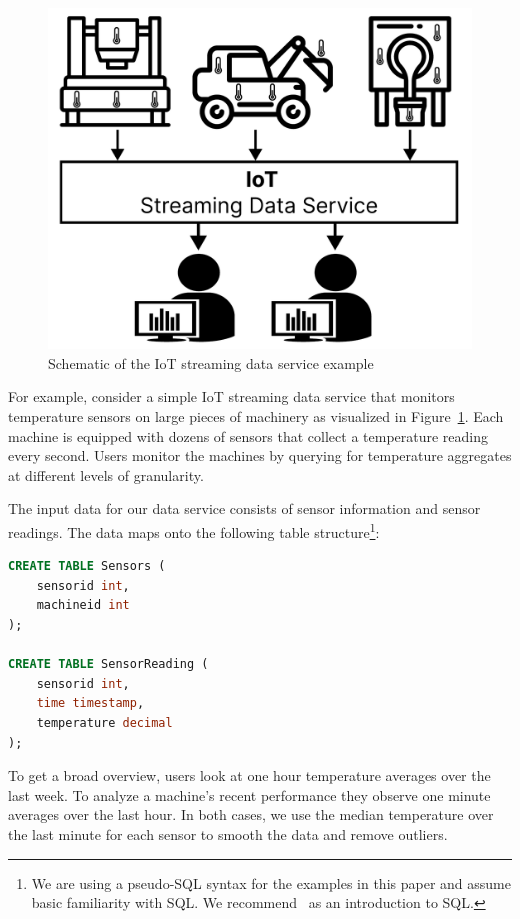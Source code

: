 \documentclass[	DIV=calc,%
							paper=letter,%
							fontsize=11pt,%
							twocolumn]{scrartcl}	 					%
\begin{document}
\begin{figure}[h]
\includegraphics[width=\linewidth]{iot_example_schematic.pdf}
\caption{Schematic of the IoT streaming data service example}
\label{fig:iot_example}
\end{figure}

For example, consider a simple IoT streaming data service that monitors temperature sensors on large pieces of machinery as visualized in Figure~\ref{fig:iot_example}. Each machine is equipped with dozens of sensors that collect a temperature reading every second. Users monitor the machines by querying for temperature aggregates at different levels of granularity.

The input data for our data service consists of sensor information and sensor readings. The data maps onto the following table structure\footnote{We are using a pseudo-SQL syntax for the examples in this paper and assume basic familiarity with SQL. We recommend~\cite{} as an introduction to SQL.}:
\begin{lstlisting}[language=SQL]
CREATE TABLE Sensors (
    sensorid int,
    machineid int
);

CREATE TABLE SensorReading (
    sensorid int,
    time timestamp,
    temperature decimal
);
\end{lstlisting}

To get a broad overview, users look at one hour temperature averages over the last week. To analyze a machine's recent performance they observe one minute averages over the last hour. In both cases, we use the median temperature over the last minute for each sensor to smooth the data and remove outliers.
\end{document}
